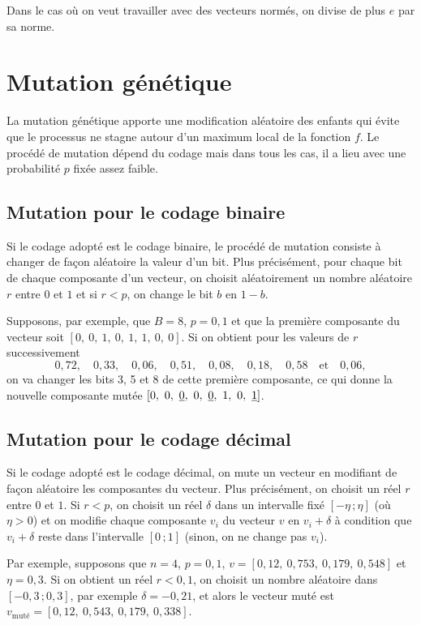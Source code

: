Dans le cas où on veut travailler avec des vecteurs normés, on divise de plus $e$ par sa norme. 

\section{Mutation génétique}

La mutation génétique apporte une modification aléatoire des \og enfants \fg{} qui évite que le processus ne stagne autour d'un maximum local de la fonction $f$. Le procédé de mutation dépend du codage mais dans tous les cas, il a lieu avec une probabilité $p$ fixée assez faible.

\subsection{Mutation pour le codage binaire}

Si le codage adopté est le codage binaire, le procédé de mutation consiste à changer de façon aléatoire la valeur d'un bit. Plus précisément, pour chaque bit de chaque composante d'un vecteur, on choisit aléatoirement un nombre aléatoire $r$ entre $0$ et $1$ et si $r<p$, on change le bit $b$ en $1-b$.

Supposons, par exemple, que $B=8$, $p=0{,}1$ et que la première composante du vecteur soit $[0,~0,~1,~0,~1,~1,~0,~0]$. Si on obtient pour les valeurs de $r$ successivement 
$$0{,}72, \quad 0{,}33, \quad 0{,}06, \quad 0{,}51, \quad 0{,}08, \quad 0{,}18, \quad 0{,}58 \quad \text{et} \quad 0{,}06,$$
on va changer les bits 3, 5 et 8 de cette première composante, ce qui donne la nouvelle composante \og mutée \fg{}  $[0,~0,~\uline{0},~0,~\uline{0},~1,~0,~\uline{1}]$.
\subsection{Mutation pour le codage décimal}

Si le codage adopté est le codage décimal, on mute un vecteur en modifiant de façon aléatoire les composantes du vecteur. Plus précisément, on choisit un réel $r$ entre $0$ et $1$. Si $r<p$, on choisit un réel $\delta$ dans un intervalle fixé $[-\eta\,; \eta]$ (où $\eta >0$) et on modifie chaque composante $v_i$ du vecteur $v$ en $v_i+\delta$ à condition que $v_i+\delta$ reste dans l'intervalle $[0\,;1]$ (sinon, on ne change pas $v_i$). 

Par exemple, supposons que $n=4$, $p=0{,}1$, $v=[0{,}12,~0{,}753,~0{,}179,~0{,}548]$ et $\eta=0{,}3$. Si on obtient un réel $r<0{,}1$, on choisit un nombre aléatoire dans $[-0{,}3\,;0{,}3]$, par exemple $\delta=-0{,}21$, et alors le vecteur muté est $v_{\text{muté}}=[0{,}12,~0{,}543,~0{,}179,~0{,}338]$.

